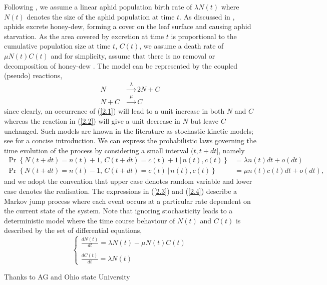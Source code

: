 \documentclass{pnastwo}
\begin{document}
\begin{article}
Following \cite{Matis06}, we assume a linear aphid population birth rate of $\lambda N(t)$ where $N(t)$ denotes the size of the aphid population at time $t$. As discussed in \cite{Prajneshu98}, aphids excrete honey-dew, forming a cover on the leaf surface and causing aphid starvation. As the area covered by excretion at time $t$ is proportional to the cumulative population size at time $t$, $C(t)$, we assume a death rate of $\mu N(t)C(t)$ and for simplicity, assume that there is no removal or decomposition of honey-dew \cite{Matis06,Matis07a,Matis08}. The model can be represented by the coupled (pseudo) reactions, 
\begin{align}
N & \xrightarrow{\phantom{a}\lambda\phantom{a}} 2N + C \label{2.1} \\
N+C & \xrightarrow{\phantom{a}\mu\phantom{a}} C \label{2.2}
\end{align}
since clearly, an occurrence of (\ref{2.1}) will lead to a unit increase in both $N$ and $C$ whereas the reaction in  (\ref{2.2}) will give a unit decrease in $N$ but leave $C$ unchanged. Such models are known in the literature as stochastic kinetic models; see \cite{Wilkinson06} for a concise introduction. We can express the probabilistic laws governing the time evolution of the process by considering a small interval $(t,t+dt]$, namely
\begin{align}
\Pr\left\{N(t+dt)=n(t)+1,\,C(t+dt)=c(t)+1\,|\,n(t),c(t)\right\}&=\lambda n(t)dt+o(dt) \label{2.3} \\
\Pr\left\{N(t+dt)=n(t)-1,\,C(t+dt)=c(t)\,|\,n(t),c(t)\right\}&=\mu n(t)c(t)dt+o(dt),\label{2.4}
\end{align}
and we adopt the convention that upper case denotes random variable and lower case denotes the realisation. The expressions in (\ref{2.3}) and (\ref{2.4}) describe a Markov jump process where each event occurs at a particular rate dependent on the current state of the system. Note that ignoring stochasticity leads to a deterministic model where the time course behaviour of $N(t)$ and $C(t)$ is described by the set of differential equations,
\[
\left\{\begin{array}{l}
\displaystyle\frac{dN(t)}{dt}=\lambda N(t)-\mu N(t)C(t)\\
\\
\displaystyle\frac{dC(t)}{dt}= \lambda N(t)
\end{array}\right.
\] 



\begin{acknowledgments}
Thanks to AG and Ohio state University
\end{acknowledgments}


\end{article}
\end{document}
